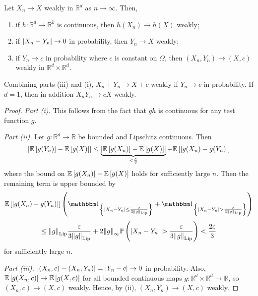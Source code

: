 \begin{proposition}
	Let \( X_n \to X \) weakly in \( \mathbb R^d \) as \( n \to \infty \).
	Then,
	\begin{enumerate}
		\item if \( h \colon \mathbb R^d \to \mathbb R^k \) is continuous, then \( h(X_n) \to h(X) \) weakly;
		\item if \( \abs{X_n - Y_n} \to 0 \) in probability, then \( Y_n \to X \) weakly;
		\item if \( Y_n \to c \) in probability where \( c \) is constant on \( \Omega \), then \( (X_n, Y_n) \to (X, c) \) weakly in \( \mathbb R^d \times \mathbb R^d \).
	\end{enumerate}
\end{proposition}
\begin{remark}
	Combining parts (iii) and (i), \( X_n + Y_n \to X + c \) weakly if \( Y_n \to c \) in probability.
	If \( d = 1 \), then in addition \( X_n Y_n \to c X \) weakly.
\end{remark}
\begin{proof}
	\emph{Part (i).}
	This follows from the fact that \( gh \) is continuous for any test function \( g \).

	\emph{Part (ii).}
	Let \( g \colon \mathbb R^d \to \mathbb R \) be bounded and Lipschitz continuous.
	Then
	\[ \abs{\mathbb{E}\left[{g(Y_n)}\right] - \mathbb{E}\left[{g(X)}\right]} \leq \underbrace{\abs{\mathbb{E}\left[{g(X_n)}\right] - \mathbb{E}\left[{g(X)}\right]}}_{< \frac{\varepsilon}{3}} + \mathbb{E}\left[{\abs{g(X_n) - g(Y_n)}}\right] \]
	where the bound on \( \mathbb{E}\left[{g(X_n)}\right] - \mathbb{E}\left[{g(X)}\right] \) holds for sufficiently large \( n \).
	Then the remaining term is upper bounded by
	\[ \expect{\abs{g(X_n) - g(Y_n)}} \qty(\mathbbm 1_{\qty{\abs{X_n - Y_n} \leq \frac{\varepsilon}{3\norm{g}_{\mathrm{Lip}}}}} + \mathbbm 1_{\qty{\abs{X_n - Y_n} > \frac{\varepsilon}{3\norm{g}_{\mathrm{Lip}}}}} ) \]
	\[ \leq \norm{g}_{\mathrm{Lip}} \frac{\varepsilon}{3\norm{g}_{\mathrm{Lip}}} + 2\norm{g}_\infty \mathbb{P}\left({\abs{X_n - Y_n} > \frac{\varepsilon}{3\norm{g}_{\mathrm{Lip}}}}\right) < \frac{2\varepsilon}{3} \]
	for sufficiently large \( n \).

	\emph{Part (iii).}
	\( \abs{(X_n, c) - (X_n, Y_n)} = \abs{Y_n - c} \to 0 \) in probability.
	Also, \( \mathbb{E}\left[{g(X_n, c)}\right] \to \mathbb{E}\left[{g(X, c)}\right] \) for all bounded continuous maps \( g \colon \mathbb R^d \times \mathbb R^d \to \mathbb R \), so \( (X_n, c) \to (X, c) \) weakly.
	Hence, by (ii), \( (X_n, Y_n) \to (X, c) \) weakly.
\end{proof}
